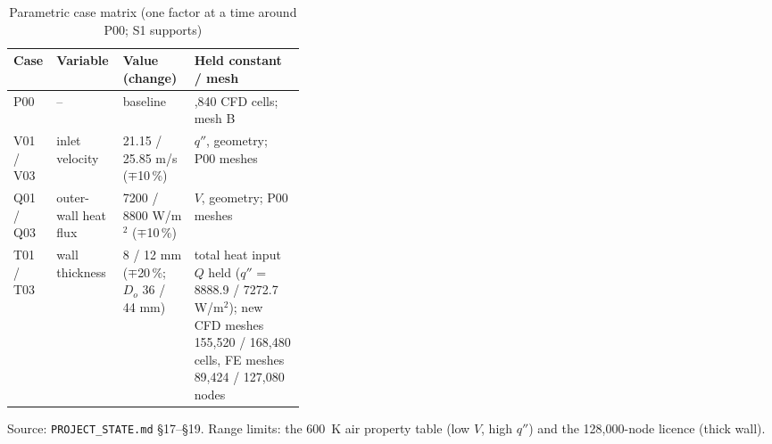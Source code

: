 \begin{table}[htbp]
\centering
\footnotesize
\caption{Parametric case matrix (one factor at a time around P00; S1 supports)}
\label{tab:pmatrix}
\begin{tabular}{lll>{\raggedright\arraybackslash}p{0.38\linewidth}}
\toprule
Case & Variable & Value (change) & Held constant / mesh \\
\midrule
P00 & -- & baseline & 159,840 CFD cells; mesh B \\
V01 / V03 & inlet velocity & 21.15 / 25.85 m/s ($\mp$10\,\%) & $q''$, geometry; P00 meshes \\
Q01 / Q03 & outer-wall heat flux & 7200 / 8800 W/m$^2$ ($\mp$10\,\%) & $V$, geometry; P00 meshes \\
T01 / T03 & wall thickness & 8 / 12 mm ($\mp$20\,\%; $D_o$ 36 / 44 mm) & total heat input $Q$ held ($q''$ = 8888.9 / 7272.7 W/m$^2$); new CFD meshes 155,520 / 168,480 cells, FE meshes 89,424 / 127,080 nodes \\
\bottomrule
\end{tabular}
\par\smallskip\parbox{\linewidth}{\footnotesize\raggedright Source: \texttt{PROJECT\_STATE.md} \S17--\S19. Range limits: the 600~K air property table (low $V$, high $q''$) and the 128,000-node licence (thick wall).}
\end{table}

